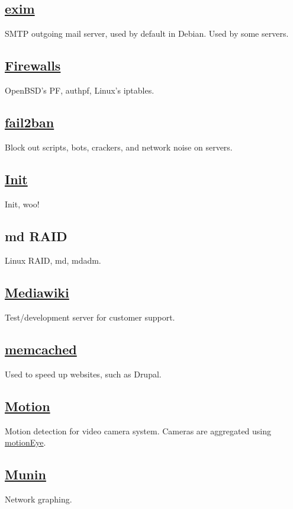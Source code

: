 \subsection{\href{http://www.exim.org/}{exim}}
SMTP outgoing mail server, used by default in Debian. Used by some servers.

\subsection{\href{http://www.openbsd.org/faq/pf/}{Firewalls}}
OpenBSD's PF, authpf, Linux's iptables.

\subsection{\href{http://www.fail2ban.org/}{fail2ban}}
Block out scripts, bots, crackers, and network noise on servers.

\subsection{\href{http://www.debian.org/}{Init}}
Init, woo!

\subsection{md RAID}
Linux RAID, md, mdadm.

\subsection{\href{http://www.mediawiki.org/}{Mediawiki}}
Test/development server for customer support.

\subsection{\href{http://www.memcached.org/}{memcached}}
Used to speed up websites, such as Drupal.

\subsection{\href{http://motion.sf.net}{Motion}}
Motion detection for video camera system. Cameras are aggregated
using \href{https://bitbucket.org/ccrisan/motioneye/wiki/Home}{motionEye}.

\subsection{\href{http://munin-monitoring.org/}{Munin}}
Network graphing.

